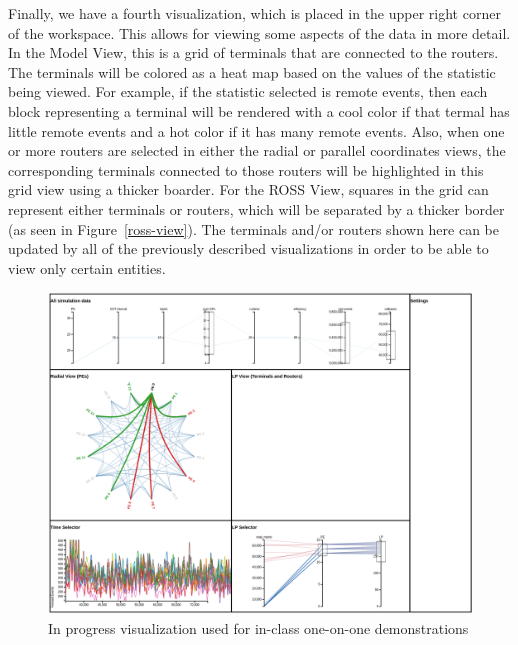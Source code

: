 \documentclass{acm_proc_article-sp}
\begin{document}
Finally, we have a fourth visualization, which is placed in the upper right corner of the workspace.  This allows for viewing some aspects of the data in more detail.  In the Model View, this is a grid of terminals that are connected to the routers.  The terminals will be colored as a heat map based on the values of the statistic being viewed. For example, if the statistic selected is remote events, then each block representing a terminal will be rendered with a cool color if that termal has little remote events and a hot color if it has many remote events. Also, when one or more routers are selected in either the radial or parallel coordinates views, the corresponding terminals connected to those routers will be highlighted in this grid view using a thicker boarder. For the ROSS View, squares in the grid can represent either terminals or routers, which will be separated by a thicker border (as seen in Figure~\ref{ross-view}).  The terminals and/or routers shown here can be updated by all of the previously described visualizations in order to be able to view only certain entities.  
\begin{figure}[t]
\centering
   \includegraphics[width=6.5in]{demo1.png}
\caption{In progress visualization used for in-class one-on-one demonstrations}
\label{intm-vis}
\end{figure}
\end{document}
